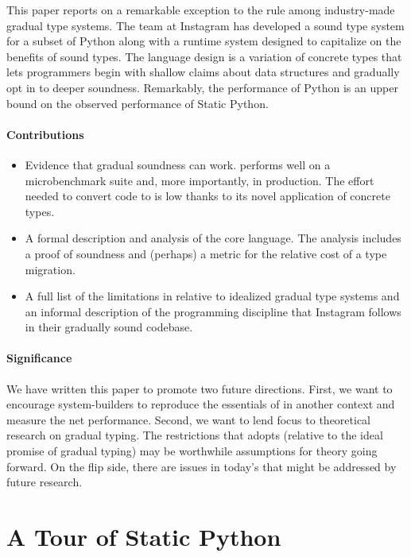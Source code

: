 \documentclass[a4paper,english,cleveref,autoref,thm-restate,anonymous,]{lipics-v2021}
\begin{document}
This paper reports on a remarkable exception to the rule among industry-made gradual type systems.
The \SP{} team at Instagram has developed a sound type system for a subset of
Python along with a runtime system designed to
capitalize on the benefits of sound types.
The language design is a variation of concrete types that lets programmers
begin with shallow claims about data structures and gradually opt in to deeper soundness.
Remarkably, the performance of Python is an upper bound on the observed performance of
Static Python.


\paragraph*{Contributions}

\begin{itemize}
  \item
    Evidence that gradual soundness can work.
    \SP{} performs well on a microbenchmark suite and, more importantly, in production.
    The effort needed to convert code to \SP{} is low thanks to its novel application
    of concrete types.
  \item
    A formal description and analysis of the \SP{} core language.
    The analysis includes a proof of soundness and (perhaps) a metric for
    the relative cost of a type migration.
  \item
    A full list of the limitations in \SP{} relative to idealized gradual type
    systems and an informal description of the programming discipline that Instagram
    follows in their gradually sound codebase.
\end{itemize}


\paragraph*{Significance}

We have written this paper to promote two future directions.
First, we want to encourage system-builders to reproduce the essentials of
\SP{} in another context and measure the net performance.
Second, we want to lend focus to theoretical research on gradual typing.
The restrictions that \SP{} adopts (relative to the ideal promise of gradual typing)
may be worthwhile assumptions for theory going forward.
On the flip side, there are issues in today's \SP{} that might
be addressed by future research.


\section{A Tour of Static Python}
\label{s:tour}
\end{document}
